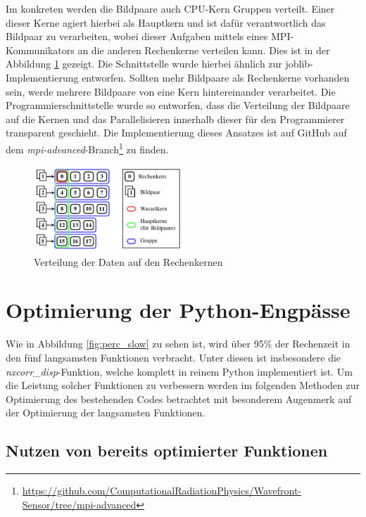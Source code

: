 Im konkreten werden die Bildpaare auch \gls{CPU}-Kern Gruppen verteilt. Einer dieser Kerne agiert hierbei als Hauptkern und ist dafür verantwortlich das Bildpaar zu verarbeiten, wobei dieser Aufgaben mittels eines \gls{MPI}-Kommunikators an die anderen Rechenkerne verteilen kann. Dies ist in der Abbildung \ref{fig:parallel_concept} gezeigt. Die Schnittstelle wurde hierbei ähnlich zur joblib-Implementierung entworfen. Sollten mehr Bildpaare als Rechenkerne vorhanden sein, werde mehrere Bildpaare von eine Kern hintereinander verarbeitet. Die Programmierschnittstelle wurde so entworfen, dass die Verteilung der Bildpaare auf die Kernen und das Parallelisieren innerhalb dieser für den Programmierer transparent geschieht. Die Implementierung dieses Ansatzes ist auf GitHub auf dem \textit{mpi-advanced}-Branch\footnote{\url{https://github.com/ComputationalRadiationPhysics/Wavefront-Sensor/tree/mpi-advanced}} zu finden.

\begin{center}
	\begin{figure}[htbp]
		\centering
		\includegraphics[width=0.5\textwidth]{pdf/parallel}
		\caption[Verteilung]{Verteilung der Daten auf den Rechenkernen}
		\label{fig:parallel_concept}
	\end{figure}
\end{center}

\section{Optimierung der Python-Engpässe}

Wie in Abbildung \ref{fig:perc_slow} zu sehen ist, wird über 95\% der Rechenzeit in den fünf langsamsten Funktionen verbracht. Unter diesen ist insbesondere die \textit{nxcorr\_disp}-Funktion, welche komplett in reinem Python implementiert ist. Um die Leistung solcher Funktionen zu verbessern werden im folgenden Methoden zur Optimierung des bestehenden Codes betrachtet mit besonderem Augenmerk auf der Optimierung der langsamsten Funktionen. 

\subsection{Nutzen von bereits optimierter Funktionen}

